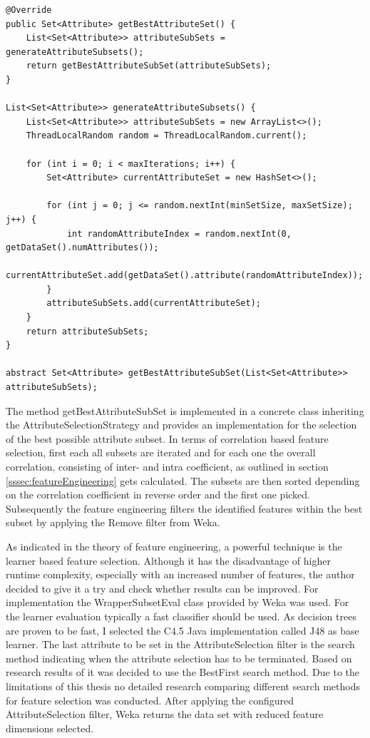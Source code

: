 \begin{lstlisting}[caption={AttributeSelectionStrategy}, label={lst:attributeSelectionStrategy}]
@Override
public Set<Attribute> getBestAttributeSet() {
	List<Set<Attribute>> attributeSubSets = generateAttributeSubsets();
	return getBestAttributeSubSet(attributeSubSets);
}

List<Set<Attribute>> generateAttributeSubsets() {
	List<Set<Attribute>> attributeSubSets = new ArrayList<>();
	ThreadLocalRandom random = ThreadLocalRandom.current();
	
	for (int i = 0; i < maxIterations; i++) {
		Set<Attribute> currentAttributeSet = new HashSet<>();
		
		for (int j = 0; j <= random.nextInt(minSetSize, maxSetSize); j++) {
			int randomAttributeIndex = random.nextInt(0, getDataSet().numAttributes());
			currentAttributeSet.add(getDataSet().attribute(randomAttributeIndex));
		}
		attributeSubSets.add(currentAttributeSet);
	}
	return attributeSubSets;
}

abstract Set<Attribute> getBestAttributeSubSet(List<Set<Attribute>> attributeSubSets);
\end{lstlisting}

The method getBestAttributeSubSet is implemented in a concrete class inheriting the AttributeSelectionStrategy and provides an implementation for the selection of the best possible attribute subset. In terms of correlation based feature selection, first each all subsets are iterated and for each one the overall correlation, consisting of inter- and intra coefficient, as outlined in section \ref{sssec:featureEngineering} gets calculated. The subsets are then sorted depending on the correlation coefficient in reverse order and the first one picked. Subsequently the feature engineering filters the identified features within the best subset by applying the Remove filter from Weka. 

As indicated in the theory of feature engineering, a powerful technique is the learner based feature selection. Although it has the disadvantage of higher runtime complexity, especially with an increased number of features, the author decided to give it a try and check whether results can be improved. For implementation the WrapperSubsetEval class provided by Weka was used. For the learner evaluation typically a fast classifier should be used. As decision trees are proven to be fast, I selected the C4.5 Java implementation called J48 as base learner. The last attribute to be set in the AttributeSelection filter is the search method indicating when the attribute selection has to be terminated. Based on research results of \cite{aggarwal2013performance} it was decided to use the BestFirst search method. Due to the limitations of this thesis no detailed research comparing different search methods for feature selection was conducted. After applying the configured AttributeSelection filter, Weka returns the data set with reduced feature dimensions selected.

